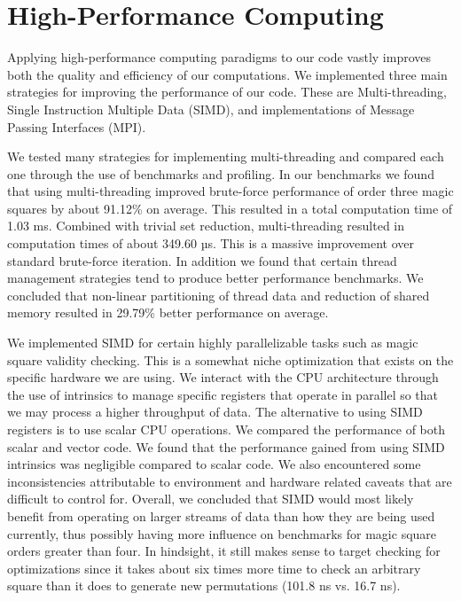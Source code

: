\documentclass[12pt]{report}
\begin{document}
\section{High-Performance Computing}

\par Applying high-performance computing paradigms to our code vastly improves both the quality and
efficiency of our computations. We implemented three main strategies for improving the performance
of our code. These are Multi-threading, Single Instruction Multiple Data (SIMD), and
implementations of Message Passing Interfaces (MPI).

\par We tested many strategies for implementing multi-threading and compared each one through the
use of benchmarks and profiling. In our benchmarks we found that using multi-threading improved
brute-force performance of order three magic squares by about 91.12\% on average. This resulted in
a total computation time of 1.03 ms. Combined with trivial set reduction, multi-threading resulted
in computation times of about 349.60 µs. This is a massive improvement over standard brute-force
iteration. In addition we found that certain thread management strategies tend to produce better
performance benchmarks. We concluded that non-linear partitioning of thread data and reduction of
shared memory resulted in 29.79\% better performance on average.

\par We implemented SIMD for certain highly parallelizable tasks such as magic square validity
checking. This is a somewhat niche optimization that exists on the specific hardware we are using.
We interact with the CPU architecture through the use of intrinsics to manage specific registers
that operate in parallel so that we may process a higher throughput of data. The alternative to
using SIMD registers is to use scalar CPU operations. We compared the performance of both scalar
and vector code. We found that the performance gained from using SIMD intrinsics was negligible
compared to scalar code. We also encountered some inconsistencies attributable to environment and
hardware related caveats that are difficult to control for. Overall, we concluded that SIMD would
most likely benefit from operating on larger streams of data than how they are being used
currently, thus possibly having more influence on benchmarks for magic square orders greater than
four. In hindsight, it still makes sense to target checking for optimizations since it takes about
six times more time to check an arbitrary square than it does to generate new permutations (101.8
ns vs. 16.7 ns).
\end{document}
